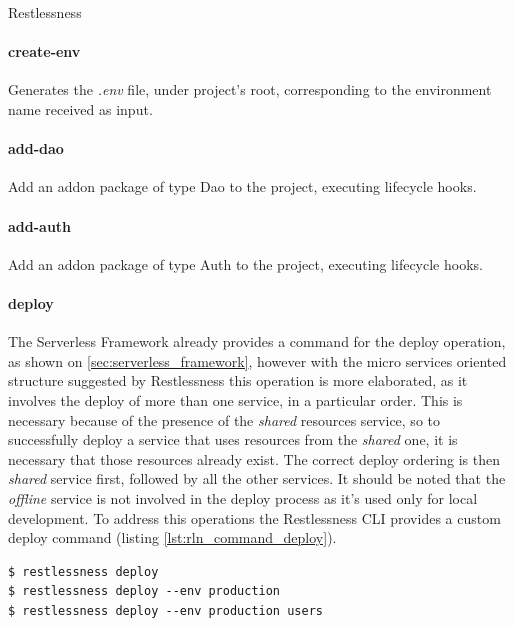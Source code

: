 \begin{chapter}{Restlessness}
    \paragraph{create-env}
    Generates the \textit{.env} file, under project's root, corresponding to the
    environment name received as input.

    \paragraph{add-dao}
    Add an addon package of type Dao to the project, executing lifecycle hooks.

    \paragraph{add-auth}
    Add an addon package of type Auth to the project, executing lifecycle hooks.

    \paragraph{deploy}
    The Serverless Framework already provides a command for the deploy operation,
    as shown on \ref{sec:serverless_framework}, however with the micro services
    oriented structure suggested by Restlessness this operation is more elaborated,
    as it involves the deploy of more than one service, in a particular order.
    This is necessary because of the presence of the \textit{shared} resources
    service, so to successfully deploy a service that uses resources from the
    \textit{shared} one, it is necessary that those resources already exist.
    The correct deploy ordering is then \textit{shared} service first, followed
    by all the other services.
    It should be noted that the \textit{offline} service is not involved in the
    deploy process as it's used only for local development.
    To address this operations the Restlessness CLI provides a custom deploy
    command (listing \ref{lst:rln_command_deploy}).

    \begin{lstlisting}[caption=Deploy command, label={lst:rln_command_deploy}]
$ restlessness deploy
$ restlessness deploy --env production
$ restlessness deploy --env production users
    \end{lstlisting}


\end{chapter}
